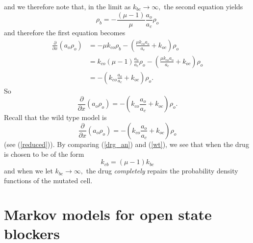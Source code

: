 and we therefore note that, in the limit as $k_{bc}\rightarrow\infty,$ the
second equation yields%
\begin{equation}
\rho_{b}=-\frac{\left(  \mu-1\right)  }{\mu}\frac{a_{o}}{a_{c}}\rho_{o}%
\end{equation}
and therefore the first equation becomes%
\begin{align}
\frac{\partial}{\partial x}\left(  a_{o}\rho_{o}\right)   &  =-\mu k_{co}%
\rho_{b}-\left(  \frac{\mu k_{co}a_{o}}{a_{c}}+k_{oc}\right)  \rho_{o}\\
&  =k_{co}\left(  \mu-1\right)  \frac{a_{o}}{a_{c}}\rho_{o}-\left(  \frac{\mu
k_{co}a_{o}}{a_{c}}+k_{oc}\right)  \rho_{o}\\
&  =-\left(  k_{co}\frac{a_{o}}{a_{c}}+k_{oc}\right)  \rho_{o}.%
\end{align}
So%
\begin{equation}
\frac{\partial}{\partial x}\left(  a_{o}\rho_{o}\right)  =-\left(  k_{co}%
\frac{a_{o}}{a_{c}}+k_{oc}\right)  \rho_{o}. \label{drg_an}%
\end{equation}
Recall that the wild type model is
 \begin{equation}
\frac{\partial}{\partial x}\left(  a_{o}\rho_{o}\right)  =-\left(  
k_{co}\frac{a_{o}}{a_{c}}+k_{oc}\right)  \rho_{o} \label{wt}%
\end{equation}
(see (\ref{reduced})). By comparing (\ref{drg_an}) and (\ref{wt}), we see that when the drug is chosen to
be of the form%
\[
k_{cb}=\left(  \mu-1\right)  k_{bc}%
\]
and when we let $k_{bc}\rightarrow\infty,$ the drug {\it completely} repairs the
probability density functions of the mutated cell.


\section{Markov models for open state blockers}

